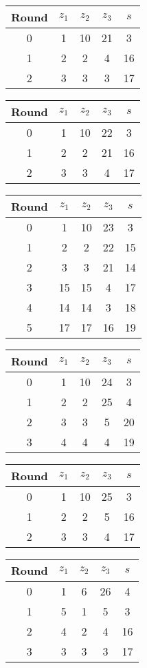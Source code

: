 \begin{multicols}{2}
\begin{tabular}{c | c | c | c | c }
Round & $z_1$ & $z_2$ & $z_3$ & $s$ \\
\hline
0 & 1 & 10 & 21 & 3 \\
1 & 2 & 2 & 4 & 16 \\
2 & 3 & 3 & 3 & 17
\end{tabular}


\begin{tabular}{c | c | c | c | c }
Round & $z_1$ & $z_2$ & $z_3$ & $s$ \\
\hline
0 & 1 & 10 & 22 & 3 \\
1 & 2 & 2 & 21 & 16 \\
2 & 3 & 3 & 4 & 17
\end{tabular}


\begin{tabular}{c | c | c | c | c }
Round & $z_1$ & $z_2$ & $z_3$ & $s$ \\
\hline
0 & 1 & 10 & 23 & 3 \\
1 & 2 & 2 & 22 & 15 \\
2 & 3 & 3 & 21 & 14 \\
3 & 15 & 15 & 4 & 17 \\
4 & 14 & 14 & 3 & 18 \\
5 & 17 & 17 & 16 & 19
\end{tabular}


\begin{tabular}{c | c | c | c | c }
Round & $z_1$ & $z_2$ & $z_3$ & $s$ \\
\hline
0 & 1 & 10 & 24 & 3 \\
1 & 2 & 2 & 25 & 4 \\
2 & 3 & 3 & 5 & 20 \\
3 & 4 & 4 & 4 & 19
\end{tabular}


\begin{tabular}{c | c | c | c | c }
Round & $z_1$ & $z_2$ & $z_3$ & $s$ \\
\hline
0 & 1 & 10 & 25 & 3 \\
1 & 2 & 2 & 5 & 16 \\
2 & 3 & 3 & 4 & 17
\end{tabular}


\begin{tabular}{c | c | c | c | c }
Round & $z_1$ & $z_2$ & $z_3$ & $s$ \\
\hline
0 & 1 & 6 & 26 & 4 \\
1 & 5 & 1 & 5 & 3 \\
2 & 4 & 2 & 4 & 16 \\
3 & 3 & 3 & 3 & 17
\end{tabular}



\end{multicols}

